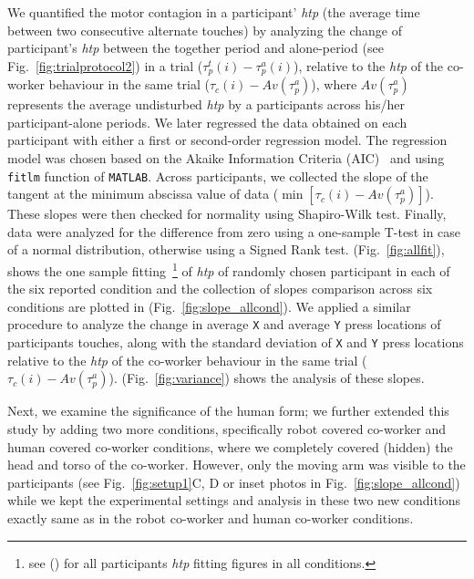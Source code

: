 We quantified the motor contagion in a participant' {\it htp} (the average time between two consecutive alternate touches) by analyzing the change of participant's {\it htp} between the together period and alone-period (see Fig.~\ref{fig:trialprotocol2}) in a trial ($\tau_p^t(i)-\tau_p^a(i)$), relative to the {\it htp} of the co-worker behaviour in the same trial ($\tau_c (i)-Av(\tau_p^a)$), where $Av(\tau_p^a)$ represents the average undisturbed {\it htp} by a participants across his/her participant-alone periods. We later regressed the data obtained on each participant with either a first or second-order regression model. The regression model was chosen based on the Akaike Information Criteria (AIC)~\cite{Akaike:ISIT:1973} and using {\tt fitlm} function of \texttt{MATLAB}. Across participants, we collected the slope of the tangent at the minimum abscissa value of data ($\min[\tau_c(i)-Av(\tau_p^a)]$). These slopes were then checked for normality using Shapiro-Wilk test. Finally, data were analyzed for the difference from zero using a one-sample T-test in case of a normal distribution, otherwise using a Signed Rank test. (Fig.~\ref{fig:allfit}), shows the one sample fitting~\footnote{see () for all participants \textit{htp} fitting figures in all conditions.} of \textit{htp} of randomly chosen participant in each of the six reported condition and the collection of slopes comparison across six conditions are plotted in (Fig.~\ref{fig:slope_allcond}). We applied a similar procedure to analyze the change in average \texttt{X} and average \texttt{Y} press locations of participants touches, along with the standard deviation of \texttt{X} and \texttt{Y} press locations relative to the {\it htp} of the co-worker behaviour in the same trial ($\tau_c(i)-Av(\tau_p^a)$). (Fig.~\ref{fig:variance}) shows the analysis of these slopes.

Next, we examine the significance of the human form; we further extended this study by adding two more conditions, specifically robot covered co-worker and human covered co-worker conditions, where we completely covered (hidden) the head and torso of the co-worker. However, only the moving arm was visible to the participants (see Fig.~\ref{fig:setup1}C, D or inset photos in Fig.~\ref{fig:slope_allcond}) while we kept the experimental settings and analysis in these two new conditions exactly same as in the robot co-worker and human co-worker conditions.


